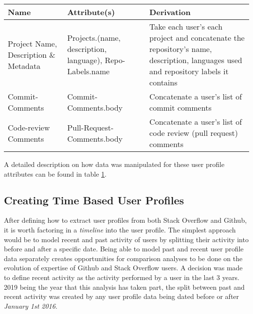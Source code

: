         \begin{table}[!htbp]
            \centering
            \label{tab:GH_userProfileExtraction}
            \vspace{6pt} %
            \begin{tabular}{|p{3cm}|p{3cm}|p{8cm}|}
               \toprule
               \textbf{Name} & \textbf{Attribute(s)} & \textbf{Derivation} \\
               \toprule
                Project Name, Description \& Metadata & Projects.(name, description, language), Repo-Labels.name & Take each user's each project and concatenate the repository's name, description, languages used and repository labels it contains\\  
                Commit-Comments & Commit-Comments.body & Concatenate a user's list of commit comments \\
                Code-review Comments & Pull-Request-Comments.body & Concatenate a user's list of code review (pull request) comments \\
               \bottomrule
            \end{tabular}
        \end{table}
        
        A detailed description on how data was manipulated for these user profile attributes can be found in table \ref{tab:GH_userProfileExtraction}.
        
        
    \subsection{Creating Time Based User Profiles}
        After defining how to extract user profiles from both Stack Overflow and Github, it is worth factoring in a \textit{timeline} into the user profile. The simplest approach would be to model recent and past activity of users by splitting their activity into before and after a specific date. Being able to model past and recent user profile data separately creates opportunities for comparison analyses to be done on the evolution of expertise of Github and Stack Overflow users. A decision was made to define recent activity as the activity performed by a user in the last 3 years. 2019 being the year that this analysis has taken part, the split between past and recent activity was created by any user profile data being dated before or after \textit{January 1st 2016}.
        
